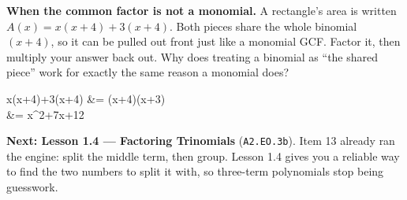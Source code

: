 \documentclass[10pt]{article}
\begin{document}
\vspace{0.10in}

\boxguard[18]
\begin{extensionbox}
\small
\textbf{When the common factor is not a monomial.} A rectangle's area is written
$A(x) = x(x+4)+3(x+4)$. Both pieces share the whole binomial $(x+4)$, so it can be pulled out front
just like a monomial GCF. Factor it, then multiply your answer back out. Why does treating a
binomial as ``the shared piece'' work for exactly the same reason a monomial does?
\begin{work}
  x(x+4)+3(x+4) &= (x+4)(x+3) \\
                &= x^2+7x+12 \quad\checkmark
\end{work}
\end{extensionbox}

\vspace{0.10in}

\begin{remindbox}
\small
\textbf{Next: Lesson 1.4 --- Factoring Trinomials} (\texttt{A2.EO.3b}). Item 13 already ran the
engine: split the middle term, then group. Lesson 1.4 gives you a reliable way to find the two
numbers to split it with, so three-term polynomials stop being guesswork.
\end{remindbox}
\end{document}
